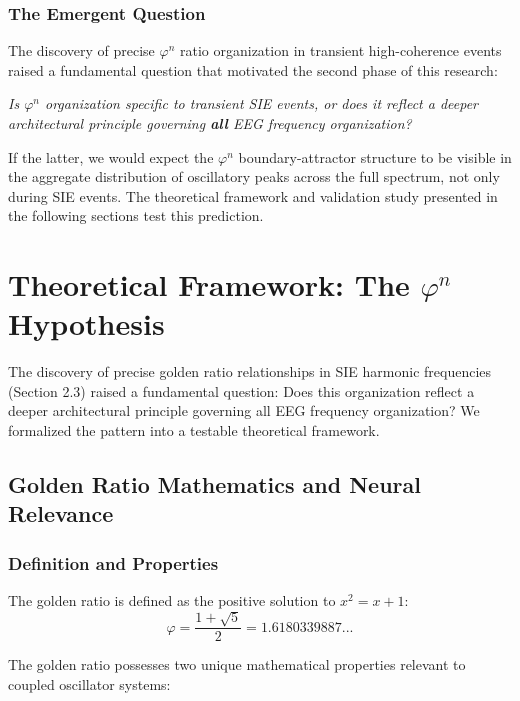 \documentclass[11pt,a4paper]{article}
\newcommand{\phisym}{\varphi}
\begin{document}
\subsubsection{The Emergent Question}
The discovery of precise $\phisym^n$ ratio organization in transient high-coherence events raised a fundamental question that motivated the second phase of this research:

\textit{Is $\phisym^n$ organization specific to transient SIE events, or does it reflect a deeper architectural principle governing \textbf{all} EEG frequency organization?}

If the latter, we would expect the $\phisym^n$ boundary-attractor structure to be visible in the aggregate distribution of oscillatory peaks across the full spectrum, not only during SIE events. The theoretical framework and validation study presented in the following sections test this prediction.

\section{Theoretical Framework: The $\phisym^n$ Hypothesis}

The discovery of precise golden ratio relationships in SIE harmonic frequencies (Section 2.3) raised a fundamental question: Does this organization reflect a deeper architectural principle governing all EEG frequency organization? We formalized the pattern into a testable theoretical framework.

\subsection{Golden Ratio Mathematics and Neural Relevance}

\subsubsection{Definition and Properties}
The golden ratio is defined as the positive solution to $x^2 = x + 1$:
\begin{equation}
\phisym = \frac{1 + \sqrt{5}}{2} = 1.6180339887...
\end{equation}

The golden ratio possesses two unique mathematical properties relevant to coupled oscillator systems:
\end{document}
